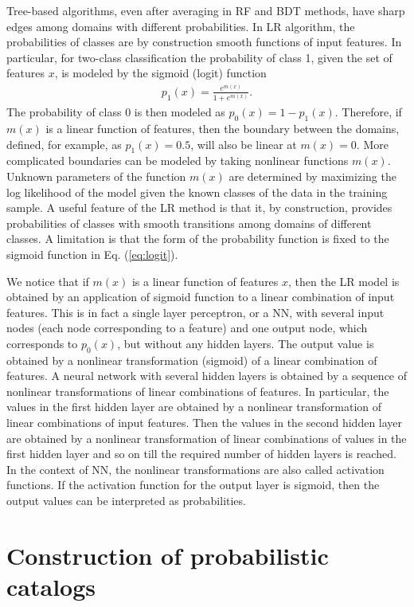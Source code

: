 \documentclass[referee]{aa} %
\newcommand{\bea}{\begin{eqnarray}}
\newcommand{\eea}{\end{eqnarray}}
\newcommand{\lb}{\label}
\begin{document}
Tree-based algorithms, even after averaging in RF and BDT methods, have sharp edges among domains with different probabilities.
In LR algorithm, the probabilities of classes are by construction smooth functions of input features.
In particular, for two-class classification the probability of class 1, given the set of features $x$, is modeled by the sigmoid (logit) function
\bea
\lb{eq:logit}
p_1(x) = \frac{e^{m(x)}}{1 + e^{m(x)}}.
\eea
The probability of class 0 is then modeled as $p_0(x) = 1 - p_1(x)$.
Therefore, if $m(x)$ is a linear function of features, then the boundary between the domains, defined, for example, as $p_1(x) = 0.5$, will also be linear
at $m(x) = 0$.
More complicated boundaries can be modeled by taking nonlinear functions $m(x)$.
Unknown parameters of the function $m(x)$ are determined by maximizing the log likelihood of the model given the known classes of the data in the training sample.
A useful feature of the LR method is that it, by construction, provides probabilities of classes with smooth transitions among domains of different classes.
A limitation is that the form of the probability function is fixed to the sigmoid function in Eq. (\ref{eq:logit}).

We notice that if $m(x)$ is a linear function of features $x$, then the LR model is obtained by an application of sigmoid function to a linear combination of input features.
This is in fact a single layer perceptron, or a NN, with several input nodes (each node corresponding to a feature) and one output node, which corresponds to $p_0(x)$, but without any hidden layers.
The output value is obtained by a nonlinear transformation (sigmoid) of a linear combination of features.
A neural network with several hidden layers is obtained by a sequence of nonlinear transformations of linear combinations of features.
In particular, the values in the first hidden layer are obtained by a nonlinear transformation of linear combinations of input features.
Then the values in the second hidden layer are obtained by a nonlinear transformation of linear combinations of values in the first hidden layer and so on till the required number of hidden layers is reached.
In the context of NN, the nonlinear transformations are also called activation functions.
If the activation function for the output layer is sigmoid, then the output values can be interpreted as probabilities.


\section{Construction of probabilistic catalogs}
\lb{sec:training}
\end{document}
